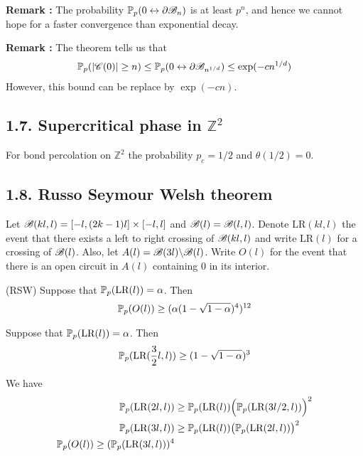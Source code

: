 \documentclass[10pt,a4paper]{report}
\begin{document}
\bull \textbf{Remark :} The probability $\mathbb{P}_p(0\leftrightarrow \partial \mathscr{B}_n)$ is at least $p^n$, and hence we cannot hope for a faster convergence than exponential decay.
\s

\bull \textbf{Remark :} The theorem tells us that
\begin{align*}
\mathbb{P}_p(|\mathscr{C}(0)|\geq n) \leq \mathbb{P}_p(0\leftrightarrow \partial \mathscr{B}_{n^{1/d}}) \leq \exp(-cn^{1/d})
\end{align*}
However, this bound can be replace by $\exp(-cn)$.

\subsection*{1.7. Supercritical phase in $\mathbb{Z}^2$}

 For bond percolation on $\mathbb{Z}^2$ the probability $p_c =1/2$ and $\theta(1/2)=0$.

\subsection*{1.8. Russo Seymour Welsh theorem}

Let $\mathscr{B}(kl,l) = [-l,(2k-1)l]\times [-l,l]$ and $\mathscr{B}(l)=\mathscr{B}(l,l)$. Denote $\text{LR}(kl,l)$ the event that there exists a left to right crossing of $\mathscr{B}(kl,l)$ and write $\text{LR}(l)$ for a crossing of $\mathscr{B}(l)$. Also, let $A(l) = \mathscr{B}(3l)\backslash \mathscr{B}(l)$. Write $O(l)$ for the event that there is an open circuit in $A(l)$ containing 0 in its interior.
\s

(RSW) Suppose that $\mathbb{P}_p(\text{LR}(l))=\alpha$. Then
\begin{align*}
\mathbb{P}_p(O(l)) \geq (\alpha(1-\sqrt{1-\alpha})^4)^{12}
\end{align*}
\s

 Suppose that $\mathbb{P}_p(\text{LR}(l)) = \alpha$. Then
\begin{align*}
\mathbb{P}_p(\text{LR}(\frac{3}{2}l,l)) \geq (1-\sqrt{1-\alpha})^3
\end{align*}
\s

 We have
\begin{align*}
\mathbb{P}_p(\text{LR}(2l,l)) &\geq \mathbb{P}_p(\text{LR}(l))\Big( \mathbb{P}_p(\text{LR}(3l/2,l))  \Big)^2 \\
\mathbb{P}_p(\text{LR}(3l,l)) &\geq \mathbb{P}_p(\text{LR}(l))\big( \mathbb{P}_p(\text{LR}(2l,l)) \big)^2\\
\mathbb{P}_p(O(l)) \geq (\mathbb{P}_p(\text{LR}(3l,l)))^4
\end{align*}
\end{document}
